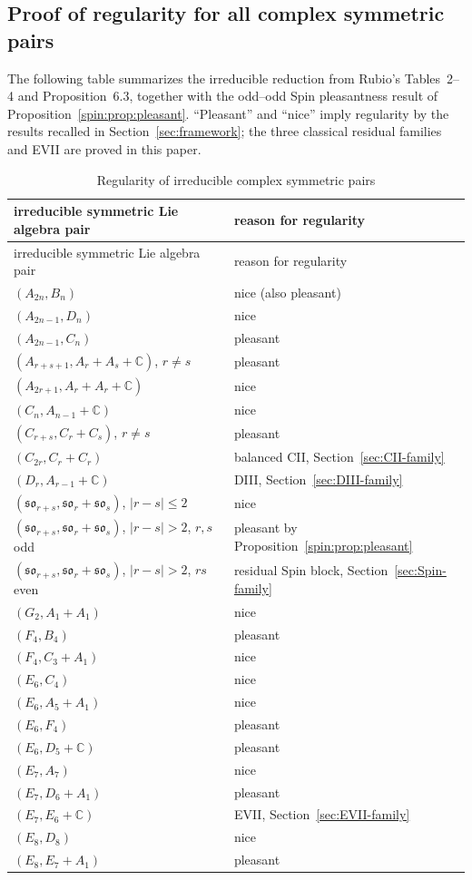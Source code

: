 \documentclass[11pt,reqno]{amsart}
\numberwithin{equation}{section}
\theoremstyle{definition}
\theoremstyle{remark}
\newcommand{\C}{\mathbb C}
\begin{document}
\subsection{Proof of regularity for all complex symmetric pairs}

The following table summarizes the irreducible reduction from Rubio's
Tables~2--4 and Proposition~6.3, together with the odd--odd Spin pleasantness
result of Proposition~\ref{spin:prop:pleasant}.  ``Pleasant'' and ``nice''
imply regularity by the results recalled in Section~\ref{sec:framework}; the
three classical residual families and EVII are proved in this paper.

\begingroup
\small
\renewcommand{\arraystretch}{1.08}
\begin{longtable}{@{}p{}p{}@{}}
\caption{Regularity of irreducible complex symmetric pairs}
\label{tab:irreducible-reduction}\\
\toprule
irreducible symmetric Lie algebra pair & reason for regularity \\
\midrule
\endfirsthead
\toprule
irreducible symmetric Lie algebra pair & reason for regularity \\
\midrule
\endhead
$(A_{2n},B_n)$ & nice (also pleasant) \\
$(A_{2n-1},D_n)$ & nice \\
$(A_{2n-1},C_n)$ & pleasant \\
$(A_{r+s+1},A_r+A_s+\C)$, $r\ne s$ & pleasant \\
$(A_{2r+1},A_r+A_r+\C)$ & nice \\
$(C_n,A_{n-1}+\C)$ & nice \\
$(C_{r+s},C_r+C_s)$, $r\ne s$ & pleasant \\
$(C_{2r},C_r+C_r)$ & balanced CII, Section~\ref{sec:CII-family} \\
$(D_r,A_{r-1}+\C)$ & DIII, Section~\ref{sec:DIII-family} \\
$(\mathfrak{so}_{r+s},\mathfrak{so}_r+\mathfrak{so}_s)$,
$|r-s|\le2$ & nice \\
$(\mathfrak{so}_{r+s},\mathfrak{so}_r+\mathfrak{so}_s)$,
$|r-s|>2$, $r,s$ odd & pleasant by Proposition~\ref{spin:prop:pleasant} \\
$(\mathfrak{so}_{r+s},\mathfrak{so}_r+\mathfrak{so}_s)$,
$|r-s|>2$, $rs$ even & residual Spin block, Section~\ref{sec:Spin-family} \\
$(G_2,A_1+A_1)$ & nice \\
$(F_4,B_4)$ & pleasant \\
$(F_4,C_3+A_1)$ & nice \\
$(E_6,C_4)$ & nice \\
$(E_6,A_5+A_1)$ & nice \\
$(E_6,F_4)$ & pleasant \\
$(E_6,D_5+\C)$ & pleasant \\
$(E_7,A_7)$ & nice \\
$(E_7,D_6+A_1)$ & pleasant \\
$(E_7,E_6+\C)$ & EVII, Section~\ref{sec:EVII-family} \\
$(E_8,D_8)$ & nice \\
$(E_8,E_7+A_1)$ & pleasant \\
\bottomrule
\end{longtable}
\endgroup
\end{document}

